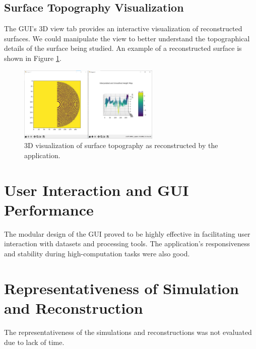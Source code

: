 \documentclass[../main.tex]{subfiles}
\begin{document}
\subsection{Surface Topography Visualization}
\vspace{-15pt}
The GUI's 3D view tab provides an interactive visualization of reconstructed surfaces. We could manipulate the view to better understand the topographical details of the surface being studied. An example of a reconstructed surface is shown in Figure \ref{fig:topography}.\\
\begin{figure}[H]
    \centering
    \includegraphics[width=0.6\textwidth]{Images/Results/3D_reconstructie}
    \caption{3D visualization of surface topography as reconstructed by the application.}
    \label{fig:topography}
\end{figure}
\vspace{-15pt}
\section{User Interaction and GUI Performance}
\vspace{-15pt}
The modular design of the GUI proved to be highly effective in facilitating user interaction with datasets and processing tools. The application's responsiveness and stability during high-computation tasks were also good.
\vspace{-15pt}
\section{Representativeness of Simulation and Reconstruction}
\vspace{-15pt}
The representativeness of the simulations and reconstructions was not evaluated due to lack of time. %
\end{document}
